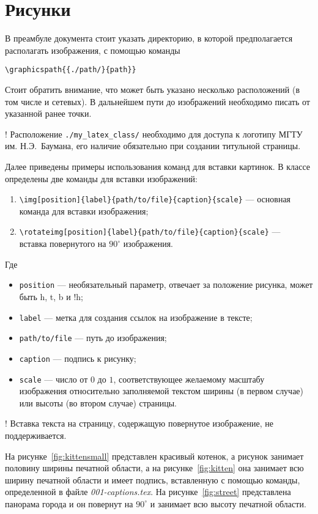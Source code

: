 \section{Рисунки}

В преамбуле документа стоит указать директорию, в которой предполагается
располагать изображения, с помощью команды 

\lstinline:\graphicspath{{./path/}{path}}:

Стоит обратить внимание, что может быть указано несколько расположений (в том
числе и сетевых). В дальнейшем пути до изображений необходимо писать от
указанной ранее точки.

! Расположение \lstinline:./my_latex_class/: необходимо для доступа к логотипу
МГТУ им. Н.Э.~Баумана, его наличие обязательно при создании титульной страницы. 

Далее приведены примеры использования команд для вставки картинок. В классе
определены две команды для вставки изображений:
\begin{enumerate}
    \item \lstinline:\img[position]{label}{path/to/file}{caption}{scale}: ---
    основная команда для вставки изображения;
    \item \lstinline:\rotateimg[position]{label}{path/to/file}{caption}{scale}: --- \\
    вставка повернутого на $90^\circ$ изображения.
\end{enumerate}
Где
\begin{itemize}
    \item \lstinline:position: --- необязательный параметр, отвечает за положение
    рисунка, может быть h, t, b и !h;
    \item \lstinline:label: --- метка для создания ссылок на изображение в тексте;
    \item \lstinline:path/to/file: --- путь до изображения;
    \item \lstinline:caption: --- подпись к рисунку;
    \item \lstinline:scale: --- число от $0$ до $1$, соответствующее желаемому
    масштабу изображения относительно заполняемой текстом ширины (в первом
    случае) или высоты (во втором случае) страницы.
\end{itemize}

! Вставка текста на страницу, содержащую повернутое изображение, не
поддерживается. 

На рисунке~\ref{fig:kittensmall} представлен красивый котенок, а
рисунок занимает половину ширины печатной области, а на рисунке~\ref{fig:kitten}
она занимает всю ширину печатной области и имеет подпись, вставленную с помощью
команды, определенной в файле \textit{001-captions.tex}. На
рисунке~\ref{fig:street} представлена панорама города и он повернут на
$90^\circ$ и занимает всю высоту печатной области. 

